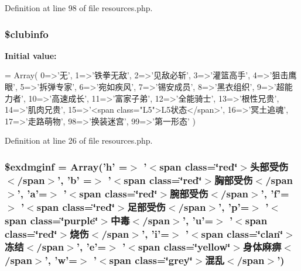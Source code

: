 Definition at line 98 of file resources.\+php.

\hypertarget{resources_8php_a8b3df41376c3d0f32c94cad94b494ce0}{
\subsubsection[{\$clubinfo}]{\setlength{\rightskip}{0pt plus 5cm}\$clubinfo}}\label{resources_8php_a8b3df41376c3d0f32c94cad94b494ce0}
{\bfseries Initial value\+:}
\begin{DoxyCode}
= Array(
    0=>\textcolor{stringliteral}{'无'},
    1=>\textcolor{stringliteral}{'铁拳无敌'},
    2=>\textcolor{stringliteral}{'见敌必斩'},
    3=>\textcolor{stringliteral}{'灌篮高手'},
    4=>\textcolor{stringliteral}{'狙击鹰眼'},
    5=>\textcolor{stringliteral}{'拆弹专家'},
    6=>\textcolor{stringliteral}{'宛如疾风'},
    7=>\textcolor{stringliteral}{'锡安成员'},
    8=>\textcolor{stringliteral}{'黑衣组织'},
    9=>\textcolor{stringliteral}{'超能力者'},
    10=>\textcolor{stringliteral}{'高速成长'},
    11=>\textcolor{stringliteral}{'富家子弟'},
    12=>\textcolor{stringliteral}{'全能骑士'},
    13=>\textcolor{stringliteral}{'根性兄贵'},
    14=>\textcolor{stringliteral}{'肌肉兄贵'},
    15=>\textcolor{stringliteral}{'<span class="L5">L5状态</span>'},
    16=>\textcolor{stringliteral}{'冥土追魂'},
    17=>\textcolor{stringliteral}{'走路萌物'},
    98=>\textcolor{stringliteral}{'换装迷宫'},
    99=>\textcolor{stringliteral}{'第一形态'}
    )
\end{DoxyCode}


Definition at line 26 of file resources.\+php.

\hypertarget{resources_8php_a2de6851aa38cafa604576a1dc520e631}{
\subsubsection[{\$exdmginf}]{\setlength{\rightskip}{0pt plus 5cm}\$exdmginf = Array('h' =$>$ '$<$span class=\char`\"{}red\char`\"{}$>$头部受伤$<$/span$>$', 'b' =$>$ '$<$span class=\char`\"{}red\char`\"{}$>$胸部受伤$<$/span$>$', 'a'=$>$ '$<$span class=\char`\"{}red\char`\"{}$>$腕部受伤$<$/span$>$', 'f'=$>$ '$<$span class=\char`\"{}red\char`\"{}$>$足部受伤$<$/span$>$', 'p'=$>$ '$<$span class=\char`\"{}purple\char`\"{}$>$中毒$<$/span$>$', 'u'=$>$ '$<$span class=\char`\"{}red\char`\"{}$>$烧伤$<$/span$>$', 'i'=$>$ '$<$span class=\char`\"{}clan\char`\"{}$>$冻结$<$/span$>$', 'e'=$>$ '$<$span class=\char`\"{}yellow\char`\"{}$>$身体麻痹$<$/span$>$', 'w'=$>$ '$<$span class=\char`\"{}grey\char`\"{}$>$混乱$<$/span$>$')}}\label{resources_8php_a2de6851aa38cafa604576a1dc520e631}


